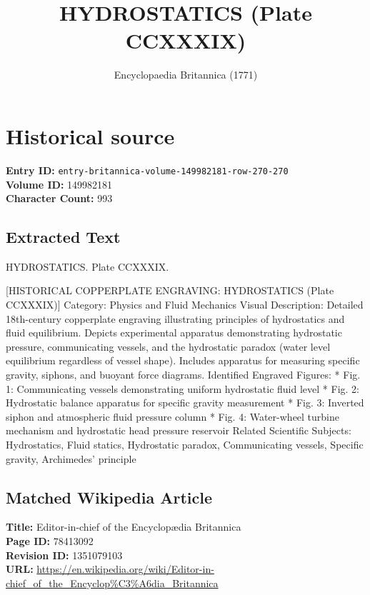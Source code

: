 \documentclass{article}
\title{HYDROSTATICS (Plate CCXXXIX)}
\date{Encyclopaedia Britannica (1771)}
\begin{document}
\maketitle

\section*{Historical source}
\textbf{Entry ID:} \texttt{entry-britannica-volume-149982181-row-270-270} \\
\textbf{Volume ID:} 149982181 \\
\textbf{Character Count:} 993

\subsection*{Extracted Text}
HYDROSTATICS. Plate CCXXXIX.

[HISTORICAL COPPERPLATE ENGRAVING: HYDROSTATICS (Plate CCXXXIX)]
Category: Physics and Fluid Mechanics
Visual Description: Detailed 18th-century copperplate engraving illustrating principles of hydrostatics and fluid equilibrium. Depicts experimental apparatus demonstrating hydrostatic pressure, communicating vessels, and the hydrostatic paradox (water level equilibrium regardless of vessel shape). Includes apparatus for measuring specific gravity, siphons, and buoyant force diagrams.
Identified Engraved Figures:
  * Fig. 1: Communicating vessels demonstrating uniform hydrostatic fluid level
  * Fig. 2: Hydrostatic balance apparatus for specific gravity measurement
  * Fig. 3: Inverted siphon and atmospheric fluid pressure column
  * Fig. 4: Water-wheel turbine mechanism and hydrostatic head pressure reservoir
Related Scientific Subjects: Hydrostatics, Fluid statics, Hydrostatic paradox, Communicating vessels, Specific gravity, Archimedes' principle

\subsection*{Matched Wikipedia Article}
\textbf{Title:} Editor-in-chief of the Encyclopædia Britannica \\
\textbf{Page ID:} 78413092 \\
\textbf{Revision ID:} 1351079103 \\
\textbf{URL:} \url{https://en.wikipedia.org/wiki/Editor-in-chief\_of\_the\_Encyclop\%C3\%A6dia\_Britannica}
\end{document}
